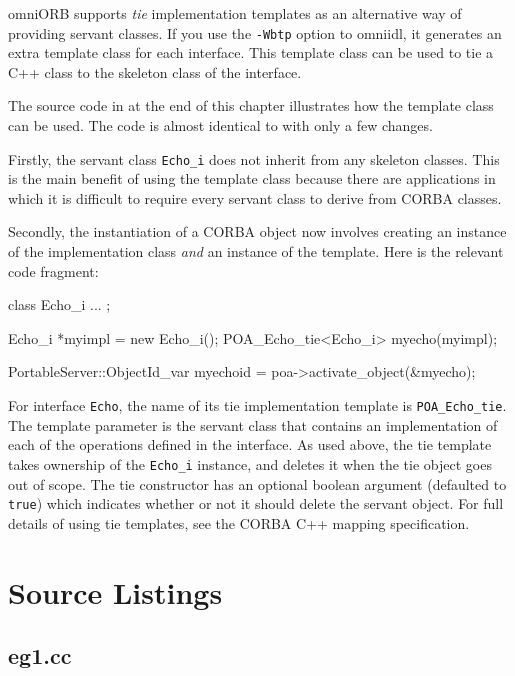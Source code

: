 \documentclass[11pt,oneside,a4paper]{book}
\newcommand{\type}[1]{\texttt{#1}}
\newcommand{\intf}[1]{\texttt{#1}}
\newcommand{\code}[1]{\texttt{#1}}
\newcommand{\term}[1]{\textit{#1}}
\newcommand{\dsc}{\discretionary{}{}{}}
\begin{document}
omniORB supports \term{tie} implementation templates as an alternative
way of providing servant classes. If you use the \texttt{-Wbtp} option
to omniidl, it generates an extra template class for each interface.
This template class can be used to tie a C++ class to the skeleton
class of the interface.

The source code in  at the end of this chapter
illustrates how the template class can be used. The code is almost
identical to  with only a few changes.

Firstly, the servant class \type{Echo\_i} does not inherit from any
skeleton classes. This is the main benefit of using the template class
because there are applications in which it is difficult to require
every servant class to derive from CORBA classes.

Secondly, the instantiation of a CORBA object now involves creating an
instance of the implementation class \emph{and} an instance of the
template.  Here is the relevant code fragment:

\begin{cxxlisting}
class Echo_i { ... };

Echo_i *myimpl = new Echo_i();
POA_Echo_tie<Echo_i> myecho(myimpl);

PortableServer::ObjectId_var myechoid = poa->activate_object(&myecho);
\end{cxxlisting}


For interface \intf{Echo}, the name of its tie implementation template
is \type{POA\_Echo\_\dsc{}tie}. The template parameter is the servant
class that contains an implementation of each of the operations
defined in the interface. As used above, the tie template takes
ownership of the \type{Echo\_i} instance, and deletes it when the tie
object goes out of scope. The tie constructor has an optional boolean
argument (defaulted to \code{true}) which indicates whether or not it
should delete the servant object. For full details of using tie
templates, see the CORBA C++ mapping specification.


\clearpage
\section{Source Listings}

\subsection{eg1.cc}


\end{document}
